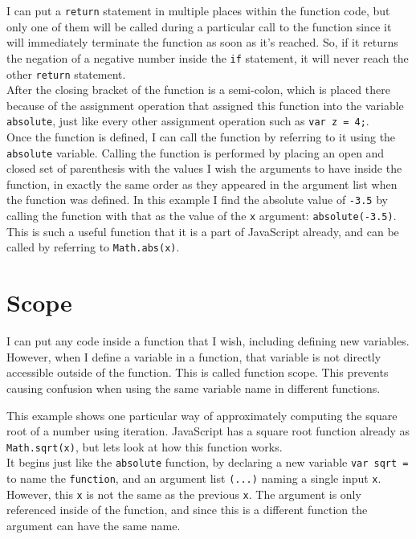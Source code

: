 I can put a \texttt{return} statement in multiple places within the function code, but only one of them will be called during a particular call to the function since it will immediately terminate the function as soon as it's reached. So, if it returns the negation of a negative number inside the \texttt{if} statement, it will never reach the other \texttt{return} statement.\\

After the closing bracket of the function is a semi-colon, which is placed there because of the assignment operation that assigned this function into the variable \texttt{absolute}, just like every other assignment operation such as \texttt{var z = 4;}.\\

Once the function is defined, I can call the function by referring to it using the \texttt{absolute} variable. Calling the function is performed by placing an open and closed set of parenthesis with the values I wish the arguments to have inside the function, in exactly the same order as they appeared in the argument list when the function was defined. In this example I find the absolute value of \texttt{-3.5} by calling the function with that as the value of the \texttt{x} argument: \texttt{absolute(-3.5)}. This is such a useful function that it is a part of JavaScript already, and can be called by referring to \texttt{Math.abs(x)}.\\

\section{Scope}

I can put any code inside a function that I wish, including defining new variables. However, when I define a variable in a function, that variable is not directly accessible outside of the function. This is called function scope. This prevents causing confusion when using the same variable name in different functions.\\


This example shows one particular way of approximately computing the square root of a number using iteration. JavaScript has a square root function already as \texttt{Math.sqrt(x)}, but lets look at how this function works.\\

It begins just like the \texttt{absolute} function, by declaring a new variable \texttt{var sqrt = } to name the \texttt{function}, and an argument list \texttt{(...)} naming a single input \texttt{x}. However, this \texttt{x} is not the same as the previous \texttt{x}. The argument is only referenced inside of the function, and since this is a different function the argument can have the same name.\\

